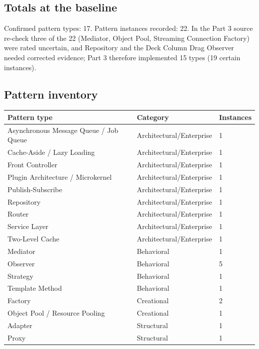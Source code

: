 \documentclass[11pt,a4paper]{article}
\begin{document}
\subsection{Totals at the baseline}
Confirmed pattern types: 17. Pattern instances recorded: 22. In the Part 3 source re-check three of the 22 (Mediator, Object Pool, Streaming Connection Factory) were rated uncertain, and Repository and the Deck Column Drag Observer needed corrected evidence; Part 3 therefore implemented 15 types (19 certain instances).

\subsection{Pattern inventory}
{\small\begin{tabularx}{\linewidth}{llX}\toprule
Pattern type & Category & Instances\\\midrule
Asynchronous Message Queue / Job Queue & Architectural/Enterprise & 1 \\
Cache-Aside / Lazy Loading & Architectural/Enterprise & 1 \\
Front Controller & Architectural/Enterprise & 1 \\
Plugin Architecture / Microkernel & Architectural/Enterprise & 1 \\
Publish-Subscribe & Architectural/Enterprise & 1 \\
Repository & Architectural/Enterprise & 1 \\
Router & Architectural/Enterprise & 1 \\
Service Layer & Architectural/Enterprise & 1 \\
Two-Level Cache & Architectural/Enterprise & 1 \\
Mediator & Behavioral & 1 \\
Observer & Behavioral & 5 \\
Strategy & Behavioral & 1 \\
Template Method & Behavioral & 1 \\
Factory & Creational & 2 \\
Object Pool / Resource Pooling & Creational & 1 \\
Adapter & Structural & 1 \\
Proxy & Structural & 1\\
\bottomrule\end{tabularx}}
\end{document}
